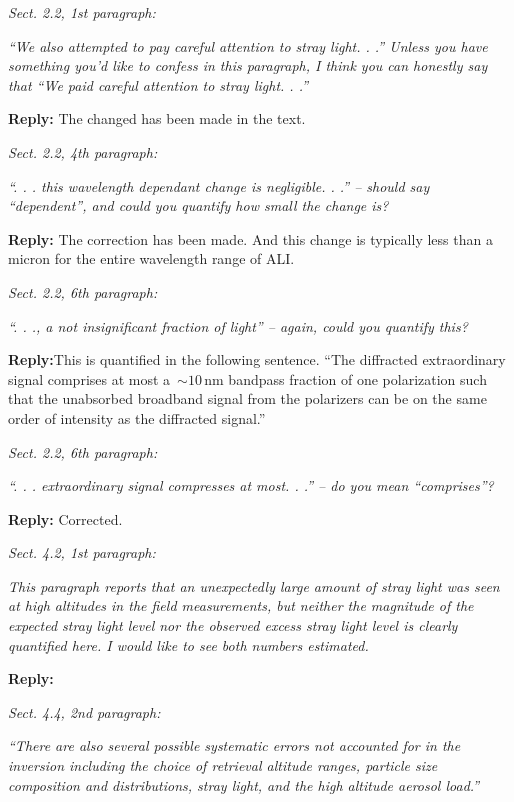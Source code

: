 \documentclass[12pt, notitlepage]{article}
\begin{document}
\hrulefill

\textit{Sect. 2.2, 1st paragraph:}

\textit{``We also attempted to pay careful attention to stray light. . .'' Unless you have something
you'd like to confess in this paragraph, I think you can honestly say that ``We paid careful
attention to stray light. . .''}

\textbf{Reply:} The changed has been made in the text.

\hrulefill

\textit{Sect. 2.2, 4th paragraph:}

\textit{``. . . this wavelength dependant change is negligible. . .'' – should say ``dependent'', and
could you quantify how small the change is?}

\textbf{Reply:} The correction has been made. And this change is typically less than a micron for the entire wavelength range of ALI.

\hrulefill

\textit{Sect. 2.2, 6th paragraph:}

\textit{``. . ., a not insignificant fraction of light'' – again, could you quantify this?}

\textbf{Reply:}This is quantified in the following sentence. ``The diffracted extraordinary signal comprises at
most a~$\sim 10$\,nm bandpass fraction of one polarization such
that the unabsorbed broadband signal from the polarizers can be on the
same order of intensity as the diffracted signal.''

\hrulefill

\textit{Sect. 2.2, 6th paragraph:}

\textit{``. . . extraordinary signal compresses at most. . .'' – do you mean ``comprises''?}

\textbf{Reply:} Corrected.

\hrulefill

\textit{Sect. 4.2, 1st paragraph:}

\textit{This paragraph reports that an unexpectedly large amount of stray light was seen at
high altitudes in the field measurements, but neither the magnitude of the expected
stray light level nor the observed excess stray light level is clearly quantified here. I
would like to see both numbers estimated.}

\textbf{Reply:}

\hrulefill

\textit{Sect. 4.4, 2nd paragraph:}

\textit{``There are also several possible systematic errors not accounted for in the inversion
including the choice of retrieval altitude ranges, particle size composition and distributions,
stray light, and the high altitude aerosol load.''}
\end{document}
